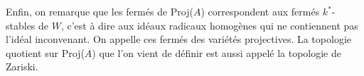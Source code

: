 Enfin, on remarque que les fermés de Proj($A$) correspondent aux fermés $k^*$-stables de $W$, c'est à dire aux idéaux radicaux homogènes qui ne contiennent pas l'idéal inconvenant. On appelle ces fermés des variétés projectives. La topologie quotient sur Proj($A$) que l'on vient de définir est aussi appelé la topologie de Zariski.
